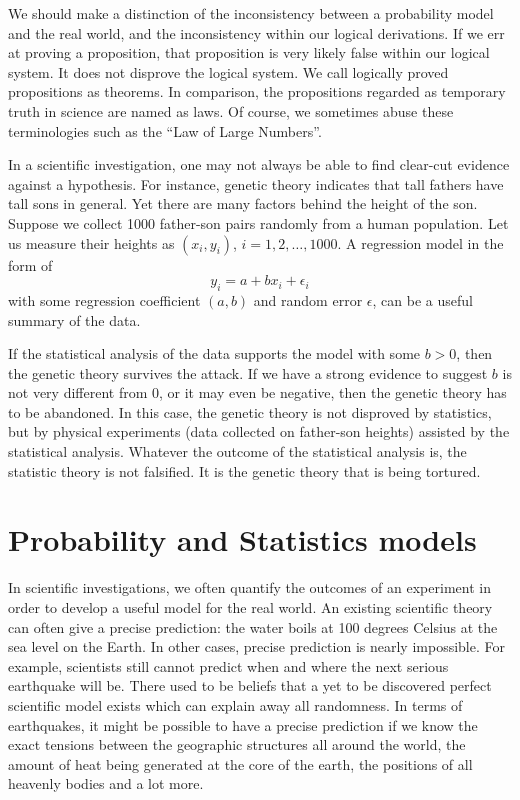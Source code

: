 We should make a distinction of the inconsistency between
a probability model and the real world, and the inconsistency
within our logical derivations. If we err at proving a proposition,
that proposition is very likely false within our logical system.
It does not disprove the logical system. We call logically
proved propositions as theorems. In comparison, the
propositions regarded as temporary truth in science are named
as laws. Of course, we sometimes abuse these terminologies
such as the ``Law of Large Numbers''.

In a scientific investigation, one may not always be able to find clear-cut
evidence against a hypothesis. For instance, genetic theory
indicates that tall fathers have tall sons in general. Yet there are
many factors behind the height of the son. 
Suppose we collect
1000 father-son pairs randomly from a human population. Let
us measure their heights as $(x_i, y_i)$, $i=1, 2, \ldots, 1000$.
A regression model in the form of
\[
y_i = a + b x_i + \epsilon_i
\]
with some regression coefficient $(a, b)$ and
random error $\epsilon$, can be a useful summary of the
data.

If the statistical analysis of the data supports the model with 
some $b > 0$, then the genetic theory survives the attack. 
If we have a strong evidence to suggest $b$ is not very
different from 0, or it may even be negative, then the
genetic theory has to be abandoned. In this case,
the genetic theory is not disproved by statistics, but by
physical experiments (data collected on father-son heights)
assisted by the statistical analysis.
Whatever the outcome of the statistical analysis is, the statistic theory is
not falsified. It is the genetic theory that is being tortured.

\section{Probability and Statistics models}
In scientific investigations, we often quantify the outcomes of an
experiment in order to develop a useful model for the real world. 
An existing scientific theory can often give a precise prediction:
the water boils at 100 degrees Celsius at the sea level on the Earth. 
In other cases, precise prediction is nearly impossible.
For example, scientists still cannot predict when and where the next serious
earthquake will be.
There used to be beliefs that a yet to be discovered perfect scientific model exists
which can explain away all randomness. 
In terms of earthquakes, it might be possible to
have a precise prediction if we know the exact tensions between the geographic
structures all around the world, the amount of heat being generated at the
core of the earth, the positions  of all heavenly bodies and a lot more.

